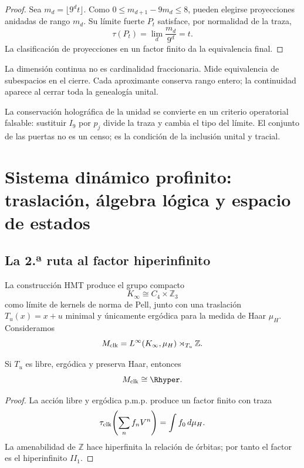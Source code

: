 \begin{proof}
Sea \(m_d=\lfloor9^dt\rfloor\). Como
\(0\le m_{d+1}-9m_d\le8\), pueden elegirse proyecciones anidadas de rango
\(m_d\). Su límite fuerte \(P_t\) satisface, por normalidad de la traza,
\[
  \tau(P_t)=\lim_d\frac{m_d}{9^d}=t.
\]
La clasificación de proyecciones en un factor finito da la equivalencia
final.
\end{proof}

La dimensión continua no es cardinalidad fraccionaria. Mide equivalencia de
subespacios en el cierre. Cada aproximante conserva rango entero; la
continuidad aparece al cerrar toda la genealogía unital.

\begin{resultbox}
La conservación holográfica de la unidad se convierte en un criterio
operatorial falsable: sustituir \(I_9\) por \(p_j\) divide la traza y cambia
el tipo del límite. El conjunto de las puertas no es un censo; es la
condición de la inclusión unital y tracial.
\end{resultbox}


\section{Sistema dinámico profinito: traslación, álgebra lógica y espacio de estados}

\subsection{La 2.ª ruta al factor hiperinfinito}

La construcción HMT produce el grupo compacto
\[
  K_\infty\cong C_4\times\mathbb Z_3
\]
como límite de kernels de norma de Pell, junto con una traslación
\(T_u(x)=x+u\) minimal y únicamente ergódica para la medida de Haar
\(\mu_H\). Consideramos
\[
  M_{\rm clk}
  =
  L^\infty(K_\infty,\mu_H)\rtimes_{T_u}\mathbb Z.
\]

\begin{theorem}
Si \(T_u\) es libre, ergódica y preserva Haar, entonces
\[
  M_{\rm clk}\cong\Rhyper.
\]
\end{theorem}

\begin{proof}
La acción libre y ergódica p.m.p. produce un factor finito con traza
\[
 \tau_{\rm clk}\!\left(\sum_nf_nV^n\right)
 =\int f_0\,d\mu_H.
\]
La amenabilidad de \(\mathbb Z\) hace hiperfinita la relación de órbitas;
por tanto el factor es el hiperinfinito \(II_1\).
\end{proof}

